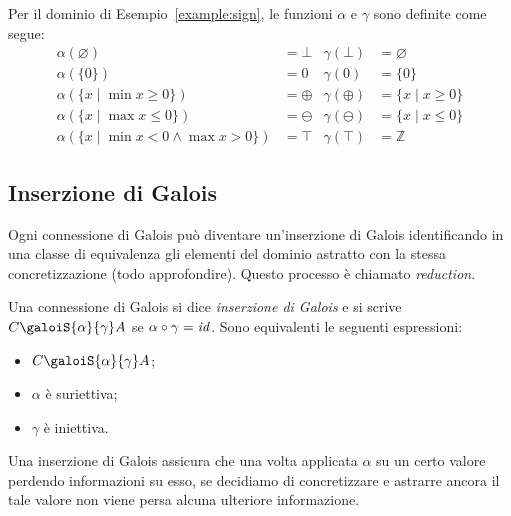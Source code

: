\begin{example}
Per il dominio di Esempio~\ref{example:sign}, le funzioni $\alpha$ e $\gamma$ sono definite come segue:
\begin{align*}
    \alpha(\varnothing)                                   & = \bot                 &
    \gamma(\bot)                                          & = \varnothing          \\
    \alpha(\{0\})                                         & = 0                    &
    \gamma(0)                                             & = \{ 0 \}              \\
    \alpha(\{ x \mid \min x \ge 0 \}) & = \oplus          &
    \gamma(\oplus)                                        & = \{ x \mid x \ge 0 \} \\
    \alpha(\{ x \mid \max x \le 0 \}) & = \ominus         &
    \gamma(\ominus)                                       & = \{ x \mid x \le 0 \} \\
    \alpha(\{ x \mid \min x < 0 \land \max x > 0\})       & = \top                 &
    \gamma(\top)                                          & = \mathbb{Z}
\end{align*}
\end{example}

\subsection{Inserzione di Galois}\label{sec:galois-i}

Ogni connessione di Galois può diventare un'inserzione di Galois identificando in una classe di equivalenza gli elementi del dominio astratto con la stessa concretizzazione (todo approfondire). Questo processo è chiamato \emph{reduction}. 

\begin{definition}
Una connessione di Galois si dice \emph{inserzione di Galois} e si scrive $C \galoiS{\alpha}{\gamma} A$ se $\alpha \circ \gamma = \mathit{id}$. Sono equivalenti le seguenti espressioni:
\begin{itemize}
    \item $C \galoiS{\alpha}{\gamma} A$;
    \item $\alpha$ è suriettiva;
    \item $\gamma$ è iniettiva.
\end{itemize}
\end{definition}

Una inserzione di Galois assicura che una volta applicata $\alpha$ su un certo valore perdendo informazioni su esso, se decidiamo di concretizzare e astrarre ancora il tale valore non viene persa alcuna ulteriore informazione.


